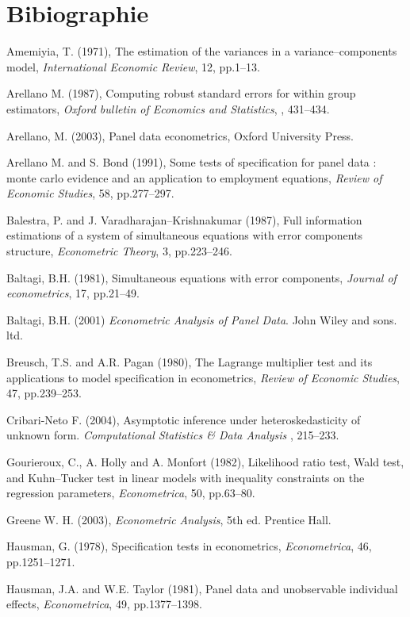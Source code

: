 \documentclass{article}
\begin{document}
\section{Bibiographie}

\setlength{\parindent}{0em}
\setlength{\parskip}{0.4cm}

  Amemiyia, T. (1971), The estimation of the variances in a
  variance--components model, \emph{International Economic Review}, 12,
  pp.1--13.

  Arellano M. (1987), Computing robust standard errors for within group estimators, 
\emph{Oxford bulletin of Economics and Statistics}, , 431--434.


  Arellano, M. (2003), Panel data econometrics, Oxford University Press.

  Arellano M. and S. Bond (1991), Some tests of specification for
  panel data : monte carlo evidence and an application to employment
  equations, \emph{Review of Economic Studies}, 58, pp.277--297.

  Balestra, P. and J. Varadharajan--Krishnakumar (1987), Full
  information estimations of a system of simultaneous equations with
  error components structure, \emph{Econometric Theory}, 3, pp.223--246.
  
  Baltagi, B.H. (1981), Simultaneous equations with error components,
  \emph{Journal of econometrics}, 17, pp.21--49.
  
  Baltagi, B.H. (2001) \emph{Econometric Analysis of Panel Data}. John
  Wiley and sons. ltd.

  Breusch, T.S. and A.R. Pagan (1980), The Lagrange multiplier test and
  its applications to model specification in econometrics, \emph{Review
    of Economic Studies}, 47, pp.239--253.

  Cribari-Neto F. (2004), Asymptotic inference under heteroskedasticity
of unknown form. \emph{Computational Statistics \& Data Analysis}
, 215--233.

  Gourieroux, C., A. Holly and A. Monfort (1982), Likelihood ratio test,
  Wald test, and Kuhn--Tucker test in linear models with inequality
  constraints on the regression parameters, \emph{Econometrica}, 50,
  pp.63--80.

  Greene W. H. (2003), \emph{Econometric Analysis}, 5th ed. Prentice Hall.

  Hausman, G. (1978), Specification tests in econometrics,
  \emph{Econometrica}, 46, pp.1251--1271.

  Hausman, J.A. and W.E. Taylor (1981), Panel data and unobservable
  individual effects, \emph{Econometrica}, 49, pp.1377--1398.
  
\end{document}
